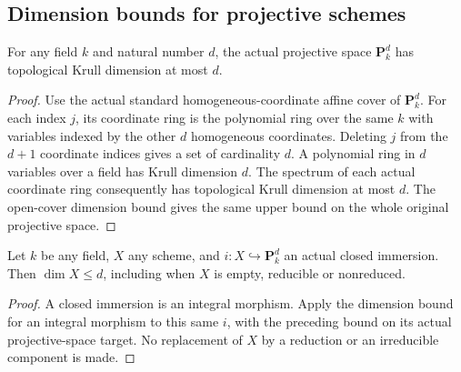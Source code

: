 \subsection{Dimension bounds for projective schemes}

\begin{lemma}
\label{lem:native-projective-space-dimension-bound}
\leanok
For any field $k$ and natural number $d$, the actual projective space
$\mathbf P^d_k$ has topological Krull dimension at most $d$.
\end{lemma}
\begin{proof}
Use the actual standard homogeneous-coordinate affine cover of
$\mathbf P^d_k$.  For each index $j$, its coordinate ring is the
polynomial ring over the same $k$ with variables indexed by the other
$d$ homogeneous coordinates.  Deleting $j$ from the $d+1$ coordinate
indices gives a set of cardinality $d$.  A polynomial ring in $d$
variables over a field has Krull dimension $d$.  The spectrum of
each actual coordinate ring consequently has topological Krull
dimension at most $d$.  The open-cover dimension bound gives the
same upper bound on the whole original projective space.
\end{proof}

\begin{lemma}
\label{lem:native-projective-closed-embedding-dimension-bound}
\leanok
Let $k$ be any field, $X$ any scheme, and
$i:X\hookrightarrow\mathbf P^d_k$ an actual closed immersion.
Then $\dim X\le d$, including when $X$ is empty, reducible or nonreduced.
\end{lemma}
\begin{proof}
A closed immersion is an integral morphism.  Apply the dimension
bound for an integral morphism to this same $i$, with the preceding
bound on its actual projective-space target.  No replacement of
$X$ by a reduction or an irreducible component is made.
\end{proof}

